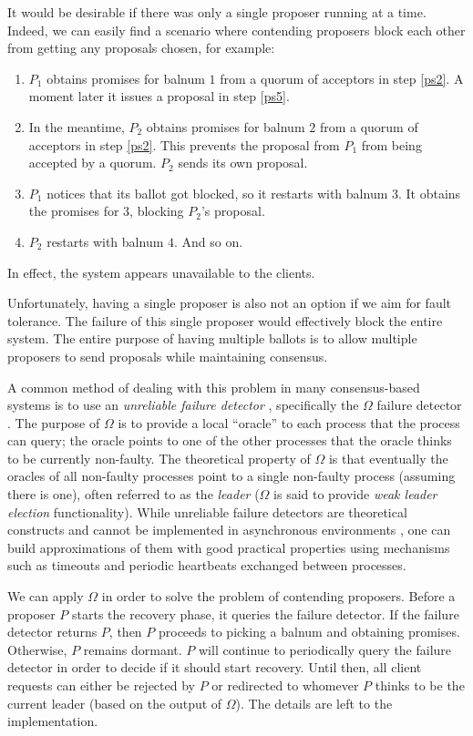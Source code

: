 \documentclass[12pt,a4paper,en]{pracamgr}
\newcommand{\ti}[1]{\textit{#1}}
\begin{document}
It would be desirable if there was only a single proposer running at a time. Indeed, we can easily find a scenario where contending proposers block each other from getting any proposals chosen, for example:
\begin{enumerate}
    \item $P_1$ obtains promises for balnum $1$ from a quorum of acceptors in step \ref{ps2}. A moment later it issues a proposal in step \ref{ps5}.
    \item In the meantime, $P_2$ obtains promises for balnum $2$ from a quorum of acceptors in step \ref{ps2}. This prevents the proposal from $P_1$ from being accepted by a quorum. $P_2$ sends its own proposal.
    \item $P_1$ notices that its ballot got blocked, so it restarts with balnum $3$. It obtains the promises for $3$, blocking $P_2$'s proposal.
    \item $P_2$ restarts with balnum $4$. And so on.
\end{enumerate}
In effect, the system appears unavailable to the clients.

Unfortunately, having a single proposer is also not an option if we aim for fault tolerance. The failure of this single proposer would effectively block the entire system. The entire purpose of having multiple ballots is to allow multiple proposers to send proposals while maintaining consensus.

A common method of dealing with this problem in many consensus-based systems is to use an \ti{unreliable failure detector} \cite{ufds}, specifically the $\Omega$ failure detector \cite{omega}. The purpose of $\Omega$ is to provide a local ``oracle'' to each process that the process can query; the oracle points to one of the other processes that the oracle thinks to be currently non-faulty. The theoretical property of $\Omega$ is that eventually the oracles of all non-faulty processes point to a single non-faulty process (assuming there is one), often referred to as the \ti{leader} ($\Omega$ is said to provide \ti{weak leader election} functionality). While unreliable failure detectors are theoretical constructs and cannot be implemented in asynchronous environments \cite{ufds}, one can build approximations of them with good practical properties using mechanisms such as timeouts and periodic heartbeats exchanged between processes.

We can apply $\Omega$ in order to solve the problem of contending proposers. Before a proposer $P$ starts the recovery phase, it queries the failure detector. If the failure detector returns $P$, then $P$ proceeds to picking a balnum and obtaining promises. Otherwise, $P$ remains dormant. $P$ will continue to periodically query the failure detector in order to decide if it should start recovery. Until then, all client requests can either be rejected by $P$ or redirected to whomever $P$ thinks to be the current leader (based on the output of $\Omega$). The details are left to the implementation.
\end{document}
